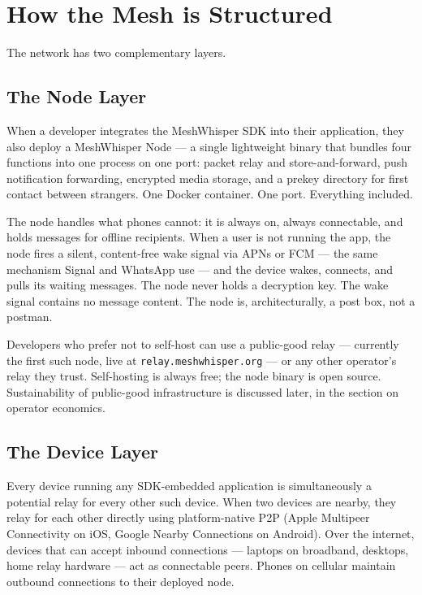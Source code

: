 \documentclass[11pt, a4paper]{article}
\begin{document}
\section{How the Mesh is Structured}

The network has two complementary layers.

\subsection{The Node Layer}

When a developer integrates the MeshWhisper SDK into their application, they also deploy a MeshWhisper Node — a single lightweight binary that bundles four functions into one process on one port: packet relay and store-and-forward, push notification forwarding, encrypted media storage, and a prekey directory for first contact between strangers. One Docker container. One port. Everything included.

The node handles what phones cannot: it is always on, always connectable, and holds messages for offline recipients. When a user is not running the app, the node fires a silent, content-free wake signal via APNs or FCM — the same mechanism Signal and WhatsApp use — and the device wakes, connects, and pulls its waiting messages. The node never holds a decryption key. The wake signal contains no message content. The node is, architecturally, a post box, not a postman.

Developers who prefer not to self-host can use a public-good relay --- currently the first such node, live at \texttt{relay.meshwhisper.org} --- or any other operator's relay they trust. Self-hosting is always free; the node binary is open source. Sustainability of public-good infrastructure is discussed later, in the section on operator economics.

\subsection{The Device Layer}

Every device running any SDK-embedded application is simultaneously a potential relay for every other such device. When two devices are nearby, they relay for each other directly using platform-native P2P (Apple Multipeer Connectivity on iOS, Google Nearby Connections on Android). Over the internet, devices that can accept inbound connections — laptops on broadband, desktops, home relay hardware — act as connectable peers. Phones on cellular maintain outbound connections to their deployed node.
\end{document}
